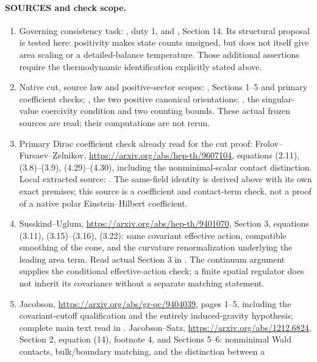 \documentclass[10pt]{article}
\begin{document}
\paragraph{SOURCES and check scope.}
\begin{enumerate}
\item Governing consistency task:
, duty 1,
and ,
Section 14. Its structural proposal is tested here: positivity makes
state counts unsigned, but does not itself give area scaling or a
detailed-balance temperature. Those additional assertions require
the thermodynamic identification explicitly stated above.
\item Native cut, source law and positive-sector scopes:
,
Sections 1--5 and primary coefficient checks;
,
the two positive canonical orientations;
,
the singular-value coercivity condition and two counting bounds.
These actual frozen sources are read; their computations are not rerun.
\item Primary Dirac coefficient check already read for the cut proof:
Frolov--Fursaev--Zelnikov, \url{https://arxiv.org/abs/hep-th/9607104},
equations (2.11), (3.8)--(3.9), (4.29)--(4.30), including the
nonminimal-scalar contact distinction. Local extracted source:
.
The same-field identity is derived above with its own exact premises;
this source is a coefficient and contact-term check, not a proof
of a native polar Einstein--Hilbert coefficient.
\item Susskind--Uglum,
\url{https://arxiv.org/abs/hep-th/9401070}, Section 3,
equations (3.11), (3.15)--(3.16), (3.22): same covariant effective
action, compatible smoothing of the cone, and the curvature
renormalization underlying the leading area term. Read actual
Section 3 in
.
The continuum argument supplies the conditional effective-action
check; a finite spatial regulator does not inherit its covariance
without a separate matching statement.
\item Jacobson,
\url{https://arxiv.org/abs/gr-qc/9404039}, pages 1--5, including
the covariant-cutoff qualification and the entirely induced-gravity
hypothesis; complete main text read in
.
Jacobson--Satz, \url{https://arxiv.org/abs/1212.6824}, Section 2,
equation (14), footnote 4, and Sections 5--6: nonminimal Wald
contacts, bulk/boundary matching, and the distinction between a

\end{enumerate}
\end{document}
